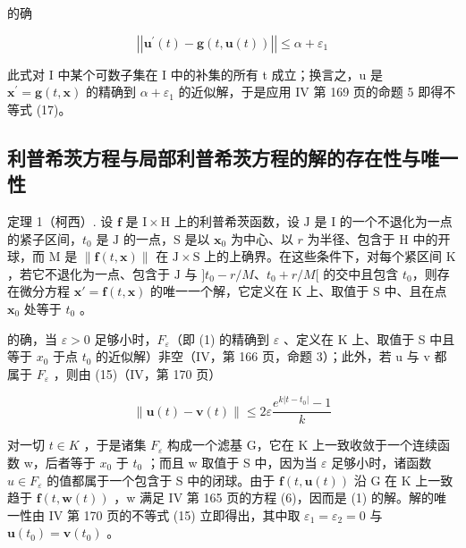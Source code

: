 的确

\[
\left| \left| \mathbf {u} ^ {\prime} (t) - \mathbf {g} (t, \mathbf {u} (t)) \right| \right| \leqslant \alpha + \varepsilon_ {1}
\]

此式对 I 中某个可数子集在 I 中的补集的所有 t 成立；换言之，u 是 \(\mathbf{x}^{\prime} = \mathbf{g}(t, \mathbf{x})\) 的精确到 \(\alpha + \varepsilon_{1}\) 的近似解，于是应用 IV 第 169 页的命题 5 即得不等式 (17)。

\subsection{利普希茨方程与局部利普希茨方程的解的存在性与唯一性}

定理 1（柯西）. 设 \(\mathbf{f}\) 是 \(\mathrm{I} \times \mathrm{H}\) 上的利普希茨函数，设 \(\mathrm{J}\) 是 \(\mathrm{I}\) 的一个不退化为一点的紧子区间，\(t_0\) 是 \(\mathrm{J}\) 的一点，\(\mathrm{S}\) 是以 \(\mathbf{x}_0\) 为中心、以 \(r\) 为半径、包含于 \(\mathrm{H}\) 中的开球，而 \(\mathrm{M}\) 是 \(\| \mathbf{f}(t, \mathbf{x})\|\) 在 \(\mathrm{J} \times \mathrm{S}\) 上的上确界。在这些条件下，对每个紧区间 \(\mathrm{K}\)，若它不退化为一点、包含于 \(\mathrm{J}\) 与 \(]t_0 - r / M\)、\(t_0 + r / M[\) 的交中且包含 \(t_0\)，则存在微分方程 \(\mathbf{x}' = \mathbf{f}(t, \mathbf{x})\) 的唯一一个解，它定义在 \(\mathrm{K}\) 上、取值于 \(\mathrm{S}\) 中、且在点 \(\mathbf{x}_0\) 处等于 \(t_0\) 。

的确，当 \(\varepsilon > 0\) 足够小时，\(F_{\varepsilon}\)（即 (1) 的精确到 \(\varepsilon\) 、定义在 K 上、取值于 S 中且等于 \(x_{0}\) 于点 \(t_{0}\) 的近似解）非空（IV，第 166 页，命题 3）；此外，若 u 与 v 都属于 \(F_{\varepsilon}\) ，则由 (15)（IV，第 170 页）

\[
\| \mathbf {u} (t) - \mathbf {v} (t) \| \leqslant 2 \varepsilon \frac {e ^ {k | t - t _ {0} |} - 1}{k}
\]

对一切 \(t \in K\) ，于是诸集 \(F_{\varepsilon}\) 构成一个滤基 G，它在 K 上一致收敛于一个连续函数 w，后者等于 \(x_{0}\) 于 \(t_{0}\) ；而且 w 取值于 S 中，因为当 \(\varepsilon\) 足够小时，诸函数 \(u \in F_{\varepsilon}\) 的值都属于一个包含于 S 中的闭球。由于 \(\mathbf{f}(t, \mathbf{u}(t))\) 沿 G 在 K 上一致趋于 \(\mathbf{f}(t, \mathbf{w}(t))\) ，w 满足 IV 第 165 页的方程 (6)，因而是 (1) 的解。解的唯一性由 IV 第 170 页的不等式 (15) 立即得出，其中取 \(\varepsilon_{1} = \varepsilon_{2} = 0\) 与 \(\mathbf{u}(t_{0}) = \mathbf{v}(t_{0})\) 。

